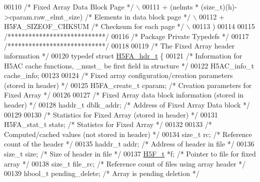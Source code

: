\begin{DoxyCode}
00110 \textcolor{preprocessor}{    }\textcolor{comment}{/* Fixed Array Data Block Page */}\textcolor{preprocessor}{                         \(\backslash\)}
00111 \textcolor{preprocessor}{    + (nelmts * (size\_t)(h)->cparam.raw\_elmt\_size) }\textcolor{comment}{/* Elements in data block page */}\textcolor{preprocessor}{  \(\backslash\)}
00112 \textcolor{preprocessor}{    + H5FA\_SIZEOF\_CHKSUM                            }\textcolor{comment}{/* Checksum for each page */}\textcolor{preprocessor}{       \(\backslash\)}
00113 \textcolor{preprocessor}{    )}
00114 
00115 \textcolor{comment}{/****************************/}
00116 \textcolor{comment}{/* Package Private Typedefs */}
00117 \textcolor{comment}{/****************************/}
00118 
00119 \textcolor{comment}{/* The Fixed Array header information */}
00120 \textcolor{keyword}{typedef} \textcolor{keyword}{struct }\hyperlink{struct_h5_f_a__hdr__t}{H5FA\_hdr\_t} \{
00121     \textcolor{comment}{/* Information for H5AC cache functions, \_must\_ be first field in structure */}
00122     H5AC\_info\_t cache\_info;
00123 
00124     \textcolor{comment}{/* Fixed array configuration/creation parameters (stored in header) */}
00125     H5FA\_create\_t cparam;               \textcolor{comment}{/* Creation parameters for Fixed Array */}
00126 
00127     \textcolor{comment}{/* Fixed Array data block information (stored in header) */}
00128     haddr\_t dblk\_addr;                   \textcolor{comment}{/* Address of Fixed Array Data block */}
00129 
00130     \textcolor{comment}{/* Statistics for Fixed Array (stored in header) */}
00131     H5FA\_stat\_t stats;                  \textcolor{comment}{/* Statistcs for Fixed Array */}
00132 
00133     \textcolor{comment}{/* Computed/cached values (not stored in header) */}
00134     \textcolor{keywordtype}{size\_t} rc;                          \textcolor{comment}{/* Reference count of the header                                */}
00135     haddr\_t addr;                       \textcolor{comment}{/* Address of header in file                                    */}
00136     \textcolor{keywordtype}{size\_t} size;                        \textcolor{comment}{/* Size of header in file                                       */}
00137     \hyperlink{struct_h5_f__t}{H5F\_t} *f;                           \textcolor{comment}{/* Pointer to file for fixed array                            
        */}
00138     \textcolor{keywordtype}{size\_t} file\_rc;                     \textcolor{comment}{/* Reference count of files using array header                  */}
00139     hbool\_t pending\_delete;             \textcolor{comment}{/* Array is pending deletion                                    */}

\end{DoxyCode}
